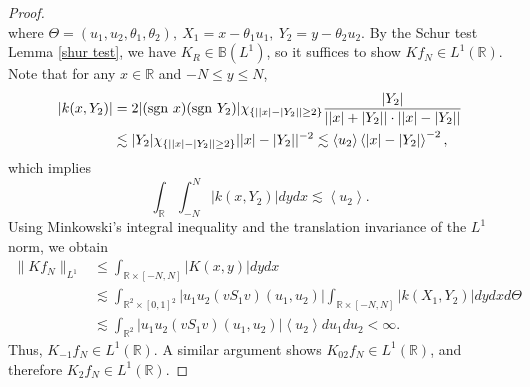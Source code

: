 \documentclass[reqno]{amsart}
\newcommand\R{\mathbb{R}}
\newcommand\B{\mathbb{B}}
\numberwithin{equation}{section}
\begin{document}
\begin{proof}
\begin{equation}
\end{equation}
where $\Theta=(u_1,u_2,\theta_1,\theta_2),\ X_1=x-\theta_1u_1,\ Y_2=y-\theta_2u_2$. By the Schur test Lemma \ref{shur test}, we have $K_R\in\B(L^1)$,  so it suffices to show $Kf_N\in L^1(\R)$. Note that for any $x\in\R$ and $-N\leq y\leq N$,
\begin{align*}
|k(x,Y_2)|&=2|({\rm sgn}~x)({\rm sgn}~Y_2)|\chi_{\{||x|-|Y_2||\geq2\}}\frac{|Y_2|}{||x|+|Y_2||\cdot||x|-|Y_2||}\\
&\lesssim|Y_2|\chi_{\{||x|-|Y_2||\geq2\}}||x|-|Y_2||^{-2}\lesssim\left<u_2\right>\left<|x|-|Y_2|\right>^{-2},
\end{align*}
which implies
$$\int_{\R}^{}\int_{-N}^{N}|k(x,Y_2)|dydx\lesssim\left<u_2\right>.$$
Using Minkowski's integral inequality and the translation invariance of the $L^1$ norm, we obtain
\begin{align*}
\|Kf_{N}\|_{L^{1}}&\leq\int_{\R\times[-N,N]}^{}\left|K(x,y)\right|dydx\\
&\lesssim\int_{\R^2\times[0,1]^2}^{}|u_1u_2(vS_1v)(u_1,u_2)|\int_{\R\times[-N,N]}^{}|k(X_1,Y_2)|dydxd\Theta\\
&\lesssim\int_{\R^2}^{}|u_1u_2(vS_1v)(u_1,u_2)|\left<u_2\right>du_1du_2<\infty.
\end{align*}
Thus, $K_{-1}f_{N}\in L^1(\R)$. A similar argument shows $K_{02}f_{N}\in L^1(\R)$, and therefore $K_2f_{N}\in L^{1}(\R)$.
\end{proof}
\appendix
\end{document}
